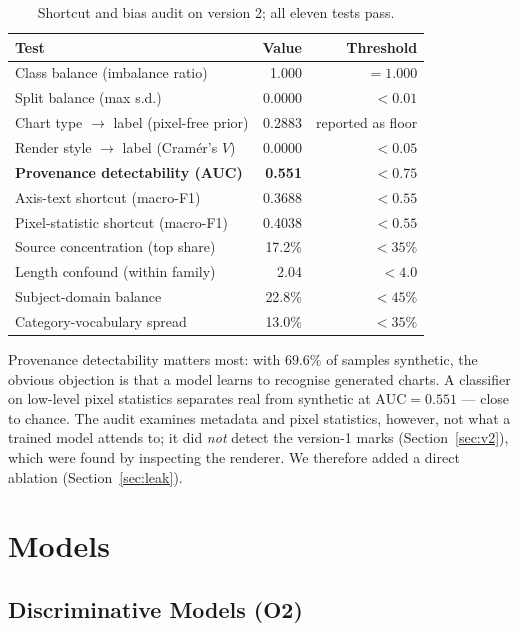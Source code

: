 \begin{table}[h]\centering\small
\caption{Shortcut and bias audit on version 2; all eleven tests pass.}
\label{tab:bias}
\begin{tabular}{lrr}
\toprule
\textbf{Test} & \textbf{Value} & \textbf{Threshold} \\
\midrule
Class balance (imbalance ratio) & 1.000 & $=1.000$ \\
Split balance (max s.d.) & 0.0000 & $<0.01$ \\
Chart type $\rightarrow$ label (pixel-free prior) & 0.2883 & reported as floor \\
Render style $\rightarrow$ label (Cram\'er's $V$) & 0.0000 & $<0.05$ \\
\textbf{Provenance detectability (AUC)} & \textbf{0.551} & $<0.75$ \\
Axis-text shortcut (macro-F1) & 0.3688 & $<0.55$ \\
Pixel-statistic shortcut (macro-F1) & 0.4038 & $<0.55$ \\
Source concentration (top share) & 17.2\% & $<35\%$ \\
Length confound (within family) & 2.04 & $<4.0$ \\
Subject-domain balance & 22.8\% & $<45\%$ \\
Category-vocabulary spread & 13.0\% & $<35\%$ \\
\bottomrule
\end{tabular}
\end{table}

Provenance detectability matters most: with $69.6\%$ of samples synthetic, the obvious
objection is that a model learns to recognise generated charts. A classifier on
low-level pixel statistics separates real from synthetic at $\mathrm{AUC}=0.551$ ---
close to chance. The audit examines metadata and pixel statistics, however, not what a
trained model attends to; it did \emph{not} detect the version-1 marks
(Section~\ref{sec:v2}), which were found by inspecting the renderer. We therefore added a
direct ablation (Section~\ref{sec:leak}).

\section{Models}
\label{sec:models}

\subsection{Discriminative Models (O2)}

